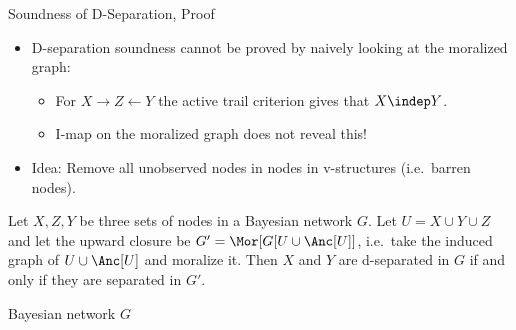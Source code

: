 \begin{frame}{Soundness of D-Separation, Proof}
    \begin{itemize}
    \item D-separation soundness cannot be proved by naively looking at the moralized graph:
    \begin{itemize} 
        \pause \item For $X \rightarrow Z \leftarrow Y$ the active trail criterion gives that $X \indep Y$.
        \pause \item  I-map on the moralized graph does not reveal this!
    \end{itemize}
    \pause \item Idea: Remove all unobserved nodes in nodes in v-structures (i.e.\ barren nodes).
    \end{itemize}
    \pause
    \begin{proposition}
    Let $X, Z, Y$ be three sets of nodes in a Bayesian network $G$.
    Let $U = X \cup Y \cup Z$ and let the upward closure be $G' = \Mor[G[U \cup \Anc[U]]$, i.e.\ take the induced graph of $U \cup \Anc[U]$ and moralize it.
    Then $X$ and $Y$ are d-separated in $G$ if and only if they are separated in $G'$.
    \end{proposition}
    \pause
    \begin{example}
    \begin{minipage}[t]{0.3\textwidth}
        \centering
        Bayesian network $G$ \\ \vspace{0.1cm}
    \end{minipage} 
    \pause
    \hfill \vrule \hfill
    \begin{minipage}[t]{0.32\textwidth}

\end{minipage}
\end{example}
\end{frame}

